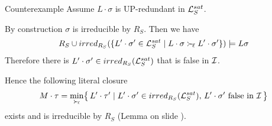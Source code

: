\documentclass[%
handout,
]{beamer}
\begin{document}
\begin{frame}[allowframebreaks]{Counterexample}
    \vspace{0.7em}
    Assume $L\cdot\sigma$ is UP-redundant in $\mathcal{L}_S^{sat}$.

    \vspace{0.7em}
    By construction $\sigma$ is irreducible by $R_S$. Then we have
    \begin{align*}
        R_S \cup irred_{R_S}(
            \{
            L'\cdot\sigma'\in\mathcal{L}_S^{sat}
            \mid
            L\cdot\sigma \mathrel\succ_{\!\ell} L'\cdot\sigma'
            \}
        )
        \models
        L\sigma
    \end{align*}
    Therefore there is $L'\cdot\sigma'\in irred_{R_S}(\mathcal{L}_S^{sat})$ that is false in $\mathcal{I}$.
    \vspace{0.7em}

    Hence the following literal closure
    \begin{gather*}
        M\cdot\tau = \min_{\mathrel\succ_{\!\ell}}\!
\left\{\,
    L'\cdot\tau' \mid
    L'\cdot\sigma' \in irred_{R_S}(\mathcal{L}_S^{sat}),\,
    L'\cdot\sigma'\text{ false in }\mathcal{I}\,
\right\}
    \end{gather*}
    exists and is irreducible by $R_S$ (Lemma on slide \pageref{irreducible}).

    \framebreak






\end{frame}
\end{document}
